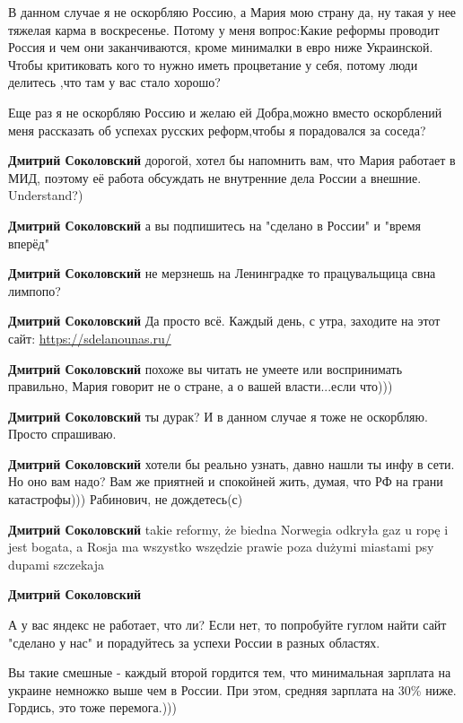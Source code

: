 \begin{itemize}
В данном случае я не оскорбляю Россию, а Мария мою страну да, ну такая у нее
тяжелая карма в воскресенье. Потому у меня вопрос:Какие реформы проводит Россия
и чем они заканчиваются, кроме минималки в евро ниже Украинской. Чтобы
критиковать кого то нужно иметь процветание у себя, потому люди делитесь ,что
там у вас стало хорошо?

\begin{itemize} %
Еще раз я не оскорбляю Россию и желаю ей Добра,можно вместо оскорблений меня рассказать об успехах русских реформ,чтобы я порадовался за соседа?

\textbf{Дмитрий Соколовский} дорогой, хотел бы напомнить вам, что Мария работает в МИД, поэтому её работа обсуждать не внутренние дела России а внешние. Understand?)

\textbf{Дмитрий Соколовский} а вы подпишитесь на "сделано в России" и "время вперёд"

\textbf{Дмитрий Соколовский} не мерзнешь на Ленинградке то працувальщица свна лимпопо?

\textbf{Дмитрий Соколовский} Да просто всё. Каждый день, с утра, заходите на этот сайт: \url{https://sdelanounas.ru/}

\textbf{Дмитрий Соколовский} похоже вы читать не умеете или воспринимать правильно, Мария говорит не о стране, а о вашей власти...если что)))

\textbf{Дмитрий Соколовский} ты дурак? И в данном случае я тоже не оскорбляю. Просто спрашиваю.

\textbf{Дмитрий Соколовский} хотели бы реально узнать, давно нашли ты инфу в сети. Но оно вам надо? Вам же приятней и спокойней жить, думая, что РФ на грани катастрофы)))
Рабинович, не дождетесь(с)

\textbf{Дмитрий Соколовский} takie reformy, że biedna Norwegia odkryła gaz u ropę i jest bogata, a Rosja ma wszystko wszędzie prawie poza dużymi miastami psy dupami szczekaja

\textbf{Дмитрий Соколовский} 

А у вас яндекс не работает, что ли? Если нет, то попробуйте гуглом найти сайт
"сделано у нас" и порадуйтесь за успехи России в разных областях.


Вы такие смешные - каждый второй гордится тем, что минимальная зарплата на
украине немножко выше чем в России. При этом, средняя зарплата на 30\% ниже.
Гордись, это тоже перемога.)))


\end{itemize}
\end{itemize}
